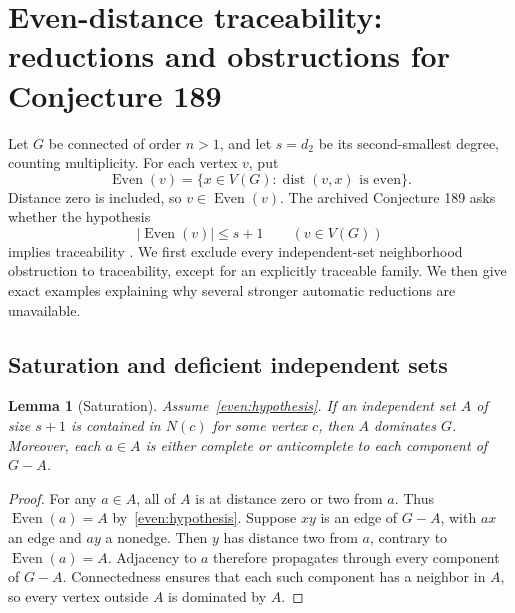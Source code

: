 \documentclass[11pt,a4paper]{article}
\newtheorem{lemma}[theorem]{Lemma}
\theoremstyle{definition}\newtheorem{definition}[theorem]{Definition}
\theoremstyle{remark}\newtheorem{remark}[theorem]{Remark}
\begin{document}
\section{Even-distance traceability: reductions and obstructions for Conjecture 189}
\label{sec:even-distance}
Let $G$ be connected of order $n>1$, and let $s=d_2$ be its
second-smallest degree, counting multiplicity. For each vertex $v$, put
\[
 \operatorname{Even}(v)=\{x\in V(G):\operatorname{dist}(v,x)
 \text{ is even}\}.
\]
Distance zero is included, so $v\in\operatorname{Even}(v)$. The archived
Conjecture 189 asks whether the hypothesis
\begin{equation}\label{even:hypothesis}
 |\operatorname{Even}(v)|\le s+1\qquad(v\in V(G))
\end{equation}
implies traceability \cite{src:catalogue}. We first exclude every
independent-set neighborhood obstruction to traceability, except for
an explicitly traceable family. We then give exact examples explaining
why several stronger automatic reductions are unavailable.

\subsection{Saturation and deficient independent sets}
\begin{lemma}[Saturation]\label{even:saturation}
Assume~\eqref{even:hypothesis}. If an independent set $A$ of size $s+1$
is contained in $N(c)$ for some vertex $c$, then $A$ dominates $G$.
Moreover, each $a\in A$ is either complete or anticomplete to each
component of $G-A$.
\end{lemma}
\begin{proof}
For any $a\in A$, all of $A$ is at distance zero or two from $a$.
Thus $\operatorname{Even}(a)=A$ by~\eqref{even:hypothesis}.
Suppose $xy$ is an edge of $G-A$, with $ax$ an edge and $ay$ a
nonedge. Then $y$ has distance two from $a$, contrary to
$\operatorname{Even}(a)=A$. Adjacency to $a$ therefore propagates
through every component of $G-A$. Connectedness ensures that each such
component has a neighbor in $A$, so every vertex outside $A$ is
dominated by $A$.
\end{proof}
\end{document}
